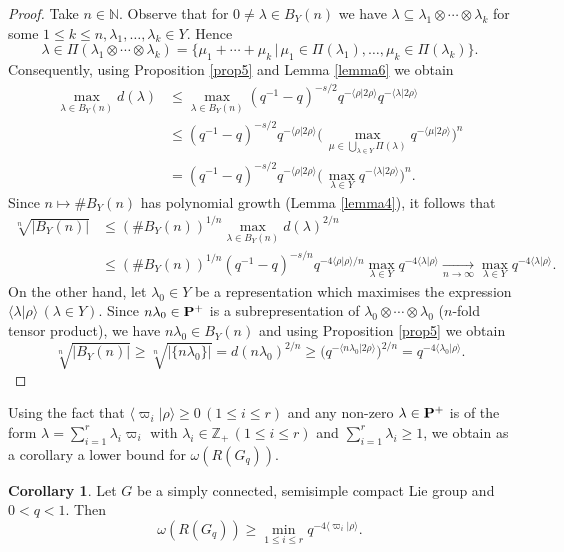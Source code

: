 \documentclass[11 pt, leqno]{amsart}
\newcommand{\la}{\langle}
\newcommand{\ra}{\rangle}
\newcommand{\NN}{\mathbb{N}}
\newcommand{\ZZ}{\mathbb{Z}}
\theoremstyle{definition}
\newtheorem{corollary}[theorem]{Corollary}
\numberwithin{equation}{section}
\begin{document}
\begin{proof}
Take $n\in\NN$. Observe that for $0\neq \lambda\in B_Y(n)$ we have $ \lambda\subseteq \lambda_1\otimes\cdots\otimes \lambda_k$ for some $1\le k \le n, \lambda_1,\dotsc,\lambda_k\in Y$. Hence
\[
\lambda\in \Pi(\lambda_1\otimes\cdots\otimes\lambda_k)=\{\mu_1+\cdots+\mu_k\,|\, \mu_1\in \Pi(\lambda_1),\dotsc,\mu_k\in \Pi(\lambda_k)\}.
\]
Consequently, using Proposition \ref{prop5} and Lemma \ref{lemma6} we obtain
\begin{align*}
\max_{\lambda\in B_Y(n)} d(\lambda) &\le 
\max_{\lambda\in B_Y(n)} 
(q^{-1}-q)^{-s/2} q^{-\la \rho|2\rho\ra } 
q^{- \la \lambda|2\rho\ra }\\
&\le 
(q^{-1}-q)^{-s/2} q^{- \la \rho|2\rho\ra } 
\bigl( \,
\max_{\mu\in\bigcup_{\lambda\in Y}\Pi(\lambda)}
q^{- \la \mu|2 \rho\ra }\bigr)^n
\\&=
(q^{-1}-q)^{-s/2} q^{- \la \rho|2 \rho\ra } 
\bigl( \,
\max_{\lambda\in Y}
q^{- \la \lambda|2 \rho\ra }\bigr)^n.
\end{align*}
Since $n\mapsto \# B_Y(n)$ has polynomial growth (Lemma \ref{lemma4}), it follows that
\begin{align*}
\sqrt[n]{|B_Y(n)|}&\le 
(\# B_Y(n))^{1/n}  
\max_{\lambda\in B_Y(n)} d(\lambda)^{2/n}\\
&\le 
(\# B_Y(n))^{1/n}  
(q^{-1}-q)^{-s/n}q^{-4\la\rho|\rho\ra/n}
\max_{\lambda\in Y} q^{-4\la\lambda|\rho\ra}
\xrightarrow[n\to\infty]{}
\max_{\lambda\in Y} q^{-4\la\lambda|\rho\ra}.
\end{align*}
On the other hand, let $\lambda_0\in Y$ be a representation which maximises the expression $\la\lambda|\rho\ra\,(\lambda\in Y)$. Since $n \lambda_0 \in \bf{P}^+$ is a subrepresentation of $\lambda_0\otimes\cdots\otimes \lambda_0$ ($n$-fold tensor product), we have $n\lambda_0\in B_Y(n)$ and using Proposition \ref{prop5} we obtain
\[
\sqrt[n]{|B_Y(n)|}\ge 
\sqrt[n]{|\{n\lambda_0\}|}=
d(n\lambda_0)^{2/n} \ge 
\bigl(q^{-\la n\lambda_0|2 \rho\ra }\bigr)^{2/n}=
 q^{-4\la \lambda_0|\rho\ra }.
\]
\end{proof}

Using the fact that $\la\varpi_i|\rho\ra \ge 0\,(1\le i \le r)$ and any non-zero $\lambda\in \bf{P}^+$ is of the form $\lambda=\sum_{i=1}^{r} \lambda_i \varpi_i$ with $\lambda_i\in \ZZ_+\,(1 \le i \le r)$ and $\sum_{i=1}^{r}\lambda_i\ge 1$, we obtain as a corollary a lower bound for $\omega(R(G_q))$.

\begin{corollary}\label{cor1}
Let $G$ be a simply connected, semisimple compact Lie group and $0<q<1$. Then
\[
\omega(R(G_q))  \ge \min_{1 \le i \le r } q^{-4\la\varpi_i |\rho\ra}.
\]
\end{corollary}
\end{document}
